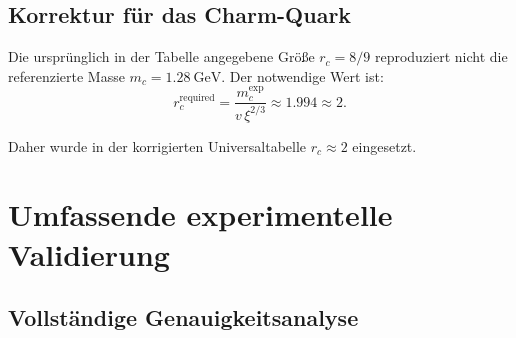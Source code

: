 	\begin{table}[H]
		\centering
		\caption{Yukawa-Vorhersagen mit korrigierten $r_i,p_i$ und Vergleich mit Referenzmassen.}
		\label{tab:quark_yukawa_predictions}
	\end{table}
	
	\subsection{Korrektur für das Charm-Quark}
	\label{subsec:charm_correction}
	
	Die ursprünglich in der Tabelle angegebene Größe $r_c=8/9$ reproduziert nicht die referenzierte Masse $m_c=1.28\ \mathrm{GeV}$. Der notwendige Wert ist:
	\[
	r_c^{\text{required}}=\frac{m_c^{\text{exp}}}{v\,\xi^{2/3}}\approx 1.994 \approx 2.
	\]
	
	Daher wurde in der korrigierten Universaltabelle $r_c \approx 2$ eingesetzt.
	
	\section{Umfassende experimentelle Validierung}
	\label{sec:comprehensive_validation}
	
	\subsection{Vollständige Genauigkeitsanalyse}
	\label{subsec:complete_accuracy}
	
